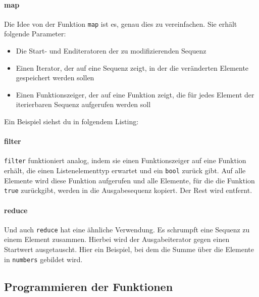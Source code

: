 \paragraph{map}
Die Idee von der Funktion \lstinline{map} ist es, genau dies zu vereinfachen.
Sie erhält folgende Parameter: 
\begin{itemize}
    \item Die Start- und Enditeratoren der zu modifizierenden Sequenz
    \item Einen Iterator, der auf eine Sequenz zeigt, in der die veränderten Elemente gespeichert werden sollen
    \item Einen Funktionszeiger, der auf eine Funktion zeigt, die für jedes Element der iterierbaren Sequenz aufgerufen werden soll
\end{itemize}

Ein Beispiel siehst du in folgendem Listing:


\paragraph{filter}
\lstinline{filter} funktioniert analog, indem sie einen Funktionszeiger auf eine Funktion erhält, die einen Listenelementtyp erwartet und ein \lstinline{bool} zurück gibt.
Auf alle Elemente wird diese Funktion aufgerufen und alle Elemente, für die die Funktion \lstinline{true} zurückgibt, werden in die Ausgabesequenz kopiert. Der Rest wird entfernt. \\


\paragraph{reduce}
Und auch \lstinline{reduce} hat eine ähnliche Verwendung.
Es schrumpft eine Sequenz zu einem Element zusammen.
Hierbei wird der Ausgabeiterator gegen einen Startwert ausgetauscht.
Hier ein Beispiel, bei dem die Summe über die Elemente in \lstinline{numbers} gebildet wird.


\subsection{Programmieren der Funktionen}
\label{sec:map-filter-reduce-basic-impl}

